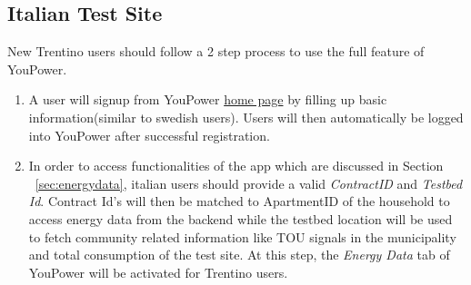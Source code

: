 \subsection{Italian Test Site}
New Trentino users should follow a 2 step process to use the full feature of YouPower.\\
\begin{enumerate}
\item A user will signup from YouPower \href{https://app.civisproject.eu/frontend.html#/welcome/}{home page} by filling up basic information(similar to swedish users). 
Users will then automatically be logged into YouPower after successful registration.
\item In order to access functionalities of the app which are discussed in Section  ~\ref{sec:energydata}, italian users should provide a valid \emph{ContractID} and \emph{Testbed Id}. Contract Id's will then be matched to ApartmentID of the household to access energy data from the backend while the testbed location will be used to fetch community related information like TOU signals in the municipality and  total consumption of the test site. At this step, the \emph{Energy Data} tab of YouPower will be activated for Trentino users.
\end{enumerate}